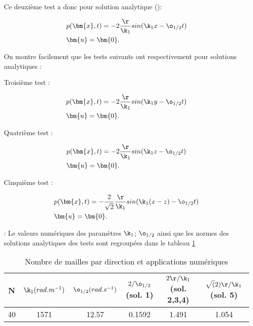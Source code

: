 Ce deuxième test a donc pour solution analytique (): 

\begin{mdframed}
\begin{align*} 
&p(\bm{x},t) = - 2 \frac{\r}{\k_1} sin(\k_1 x - \o_{1/2} t)  \\
&\bm{u} = \bm{0}.   
\end{align*}
\end{mdframed}

On montre facilement que les tests suivants ont respectivement pour solutions analytiques : 

Troisième test : 
\begin{mdframed}
\begin{align*} 
&p(\bm{x},t) = - 2 \frac{\r}{\k_1} sin(\k_1 y - \o_{1/2} t)  \\
&\bm{u} = \bm{0}.   
\end{align*}
\end{mdframed}

Quatrième test : 
\begin{mdframed}
\begin{align*} 
&p(\bm{x},t) = - 2 \frac{\r}{\k_1} sin(\k_1 z - \o_{1/2} t)  \\
&\bm{u} = \bm{0}.   
\end{align*}
\end{mdframed}

Cinquième test : 
\begin{mdframed}
\begin{align*} 
&p(\bm{x},t) = - \frac{2}{\sqrt{2}} \frac{\r}{\k_1} sin(\k_1 (x-z) - \o_{1/2} t) \\
&\bm{u} = \bm{0}.   
\end{align*}
\end{mdframed}

 : Le valeurs numériques des paramètres $\k_1$; $\o_{1/2}$ ainsi que les normes des solutions analytiques des tests sont regroupées dans le tableau \ref{tab : AN}

\begin{table}[h]
\begin{center}
\begin{tabular}{c|c|c|c|c|c}
 N  & $\k_1(rad.m^{-1})$        & $\o_{1/2}(rad.s^{-1})$ & $2/ \o_{1/2}$ (sol. 1) & $2 \r / \k_1$ (sol. 2,3,4) & $\sqrt(2) \r / \k_1$ (sol. 5)  \\ \hline
 40 & 1571                      &   12.57                & 0.1592                &   1.491                    & 1.054
\end{tabular}
\end{center}
\caption{Nombre de mailles par direction et applications numériques}
\label{tab : AN}
\end{table}

